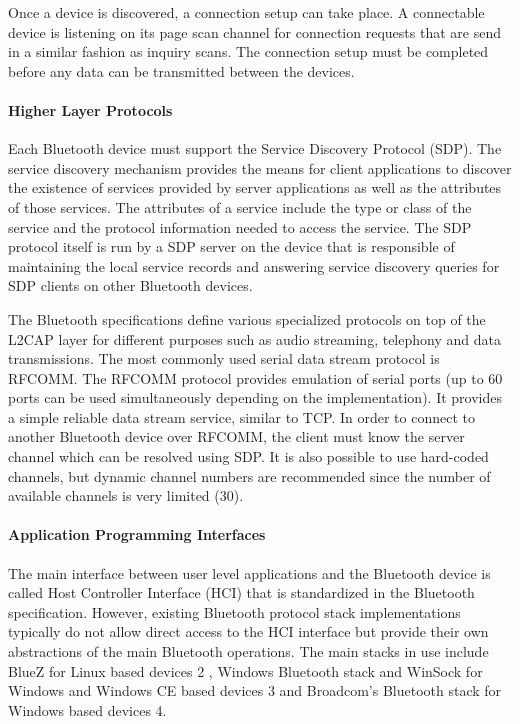 Once a device is discovered, a connection setup can take place. A connectable device is listening on its page scan channel for connection requests that are send in a
similar fashion as inquiry scans. The connection setup must be completed before any data can be transmitted between the devices.

\paragraph*{Higher Layer Protocols}

Each Bluetooth device must support the Service Discovery Protocol (SDP). The service discovery mechanism provides the means for client applications to discover
the existence of services provided by server applications as well as the attributes of those services. The attributes of a service include the type or class of the service and
the protocol information needed to access the service. The SDP protocol itself is run by a SDP server on the device that is responsible of maintaining the local service records
and answering service discovery queries for SDP clients on other Bluetooth devices.

The Bluetooth specifications define various specialized protocols on top of the L2CAP layer for different purposes such as audio streaming, telephony and data
transmissions. The most commonly used serial data stream protocol is RFCOMM. The RFCOMM protocol provides emulation of serial ports (up to 60 ports can be used
simultaneously depending on the implementation). It provides a simple reliable data stream service, similar to TCP. In order to connect to another Bluetooth device over
RFCOMM, the client must know the server channel which can be resolved using SDP. It is also possible to use hard-coded channels, but dynamic channel numbers are 
recommended since the number of available channels is very limited (30).

\paragraph*{Application Programming Interfaces}

The main interface between user level applications and the Bluetooth device is
called Host Controller Interface (HCI) that is standardized in the Bluetooth specification. However, existing Bluetooth protocol stack implementations typically do not
allow direct access to the HCI interface but provide their own abstractions of the main Bluetooth operations. The main stacks in use include BlueZ for Linux based devices 2 ,
Windows Bluetooth stack and WinSock for Windows and Windows CE based devices 3 and Broadcom's Bluetooth stack for Windows based devices 4.

